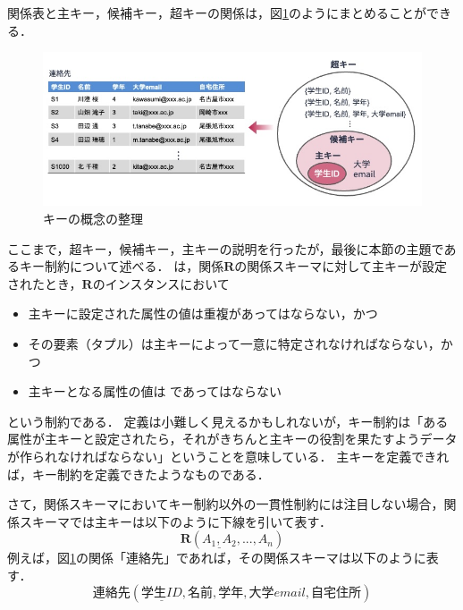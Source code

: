 関係表と主キー，候補キー，超キーの関係は，図\ref{fig:key-concept-mapping}のようにまとめることができる．
\begin{figure}[tb]
    \centering
    \includegraphics[width=1.0\textwidth]{figure/key-concept-mapping.jpg}
    \caption{キーの概念の整理}
    \label{fig:key-concept-mapping}
\end{figure}

ここまで，超キー，候補キー，主キーの説明を行ったが，最後に本節の主題であるキー制約について述べる．
 は，関係$\boldsymbol{R}$の関係スキーマに対して主キーが設定されたとき，$\boldsymbol{R}$のインスタンスにおいて
\begin{itemize}
\item 主キーに設定された属性の値は重複があってはならない，かつ
\item その要素（タプル）は主キーによって一意に特定されなければならない，かつ
\item 主キーとなる属性の値は であってはならない
\end{itemize}
という制約である．
定義は小難しく見えるかもしれないが，キー制約は「ある属性が主キーと設定されたら，それがきちんと主キーの役割を果たすようデータが作られなければならない」ということを意味している．
主キーを定義できれば，キー制約を定義できたようなものである．

さて，関係スキーマにおいてキー制約以外の一貫性制約には注目しない場合，関係スキーマでは主キーは以下のように下線を引いて表す．
\begin{equation}
\boldsymbol{R}(\underline{A_1, A_2}, ..., A_n)
\end{equation}
例えば，図\ref{fig:key-concept-mapping}の関係「連絡先」であれば，その関係スキーマは以下のように表す．
\begin{equation}
連絡先(\underline{学生ID}, 名前, 学年, 大学email, 自宅住所)
\end{equation}

